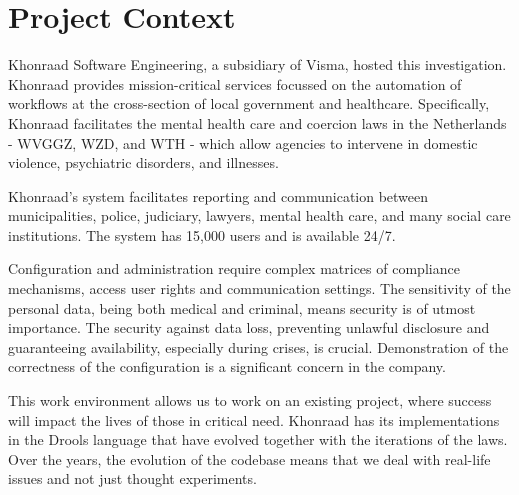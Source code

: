 \section{Project Context}

Khonraad Software Engineering, a subsidiary of Visma, hosted this investigation.
Khonraad provides mission-critical services focussed on the automation of workflows at the cross-section of local government and healthcare.
Specifically, Khonraad facilitates the mental health care and coercion laws in the Netherlands - WVGGZ, WZD, and WTH - which allow agencies to intervene in domestic violence, psychiatric disorders, and illnesses.

Khonraad's system facilitates reporting and communication between municipalities, police, judiciary, lawyers, mental health care, and many social care institutions.
The system has 15,000 users and is available 24/7.

Configuration and administration require complex matrices of compliance mechanisms, access user rights and communication settings.
The sensitivity of the personal data, being both medical and criminal, means security is of utmost importance.
The security against data loss, preventing unlawful disclosure and guaranteeing availability, especially during crises, is crucial.
Demonstration of the correctness of the configuration is a significant concern in the company.

This work environment allows us to work on an existing project, where success will impact the lives of those in critical need.
Khonraad has its implementations in the Drools language that have evolved together with the iterations of the laws.
Over the years, the evolution of the codebase means that we deal with real-life issues and not just thought experiments.